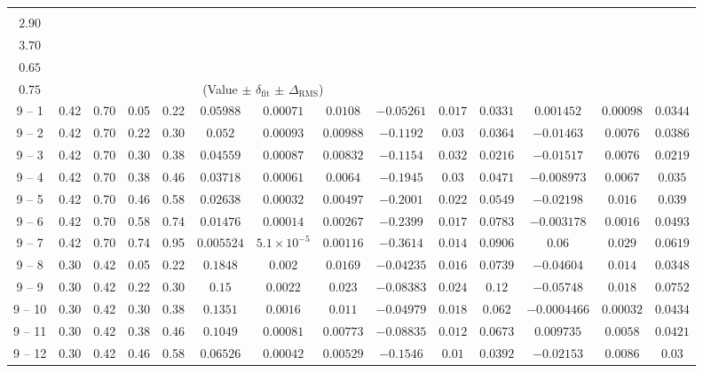 \begin{longtable}{|*{14}{c|}}
 & \makecell{$Q^{2}_{\min}$\\$2.90$} & \makecell{$Q^{2}_{\max}$\\$3.70$} & \makecell{$y_{\min}$\\$0.65$} & \makecell{$y_{\max}$\\$0.75$} & \multicolumn{9}{c|}{(Value $\pm$ $\delta_{\mathrm{fit}}$ $\pm$ $\Delta_{\mathrm{RMS}}$)} \\
\hline
9 -- 1 & 0.42 & 0.70 & 0.05 & 0.22 & $0.05988$ & $0.00071$ & $0.0108$ & $-0.05261$ & $0.017$ & $0.0331$ & $0.001452$ & $0.00098$ & $0.0344$ \\
\hline
9 -- 2 & 0.42 & 0.70 & 0.22 & 0.30 & $0.052$ & $0.00093$ & $0.00988$ & $-0.1192$ & $0.03$ & $0.0364$ & $-0.01463$ & $0.0076$ & $0.0386$ \\
\hline
9 -- 3 & 0.42 & 0.70 & 0.30 & 0.38 & $0.04559$ & $0.00087$ & $0.00832$ & $-0.1154$ & $0.032$ & $0.0216$ & $-0.01517$ & $0.0076$ & $0.0219$ \\
\hline
9 -- 4 & 0.42 & 0.70 & 0.38 & 0.46 & $0.03718$ & $0.00061$ & $0.0064$ & $-0.1945$ & $0.03$ & $0.0471$ & $-0.008973$ & $0.0067$ & $0.035$ \\
\hline
9 -- 5 & 0.42 & 0.70 & 0.46 & 0.58 & $0.02638$ & $0.00032$ & $0.00497$ & $-0.2001$ & $0.022$ & $0.0549$ & $-0.02198$ & $0.016$ & $0.039$ \\
\hline
9 -- 6 & 0.42 & 0.70 & 0.58 & 0.74 & $0.01476$ & $0.00014$ & $0.00267$ & $-0.2399$ & $0.017$ & $0.0783$ & $-0.003178$ & $0.0016$ & $0.0493$ \\
\hline
9 -- 7 & 0.42 & 0.70 & 0.74 & 0.95 & $0.005524$ & $5.1\times 10^{-5}$ & $0.00116$ & $-0.3614$ & $0.014$ & $0.0906$ & $0.06$ & $0.029$ & $0.0619$ \\
\hline
9 -- 8 & 0.30 & 0.42 & 0.05 & 0.22 & $0.1848$ & $0.002$ & $0.0169$ & $-0.04235$ & $0.016$ & $0.0739$ & $-0.04604$ & $0.014$ & $0.0348$ \\
\hline
9 -- 9 & 0.30 & 0.42 & 0.22 & 0.30 & $0.15$ & $0.0022$ & $0.023$ & $-0.08383$ & $0.024$ & $0.12$ & $-0.05748$ & $0.018$ & $0.0752$ \\
\hline
9 -- 10 & 0.30 & 0.42 & 0.30 & 0.38 & $0.1351$ & $0.0016$ & $0.011$ & $-0.04979$ & $0.018$ & $0.062$ & $-0.0004466$ & $0.00032$ & $0.0434$ \\
\hline
9 -- 11 & 0.30 & 0.42 & 0.38 & 0.46 & $0.1049$ & $0.00081$ & $0.00773$ & $-0.08835$ & $0.012$ & $0.0673$ & $0.009735$ & $0.0058$ & $0.0421$ \\
\hline
9 -- 12 & 0.30 & 0.42 & 0.46 & 0.58 & $0.06526$ & $0.00042$ & $0.00529$ & $-0.1546$ & $0.01$ & $0.0392$ & $-0.02153$ & $0.0086$ & $0.03$ \\

\end{longtable}
